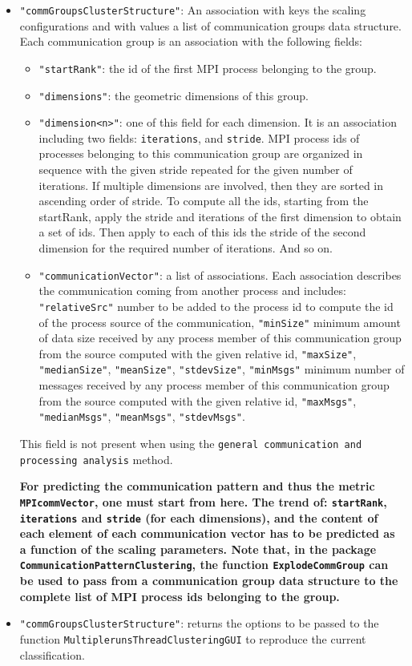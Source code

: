 \documentclass[a4paper, 10pt]{article}
\begin{document}
\begin{itemize}
 \item \verb!"commGroupsClusterStructure"!: An association with keys the scaling configurations and with values a list of communication groups \cite{wu2012}
 data structure.
 Each communication group is an association with the following fields:
 \begin{itemize}
 \item \verb!"startRank"!: the id of the first MPI process belonging to the group.
 \item \verb!"dimensions"!: the geometric dimensions of this group.
 \item \verb!"dimension<n>"!: one of this field for each dimension. It is an association including two fields: \verb!iterations!, and \verb!stride!.
 MPI process ids of processes belonging to this communication group are organized in sequence with the given stride repeated for the given
 number of iterations. If multiple dimensions are involved, then they are sorted in ascending order of stride. To compute all the ids, starting from
 the startRank, apply the stride and iterations of the first dimension to obtain a set of ids. Then apply to each of this ids the stride of the second dimension
 for the required number of iterations. And so on.
 \item \verb!"communicationVector"!: a list of associations. Each association describes the communication coming from another process and includes: 
 \verb!"relativeSrc"! number to be added to the process id to compute the id of the process source of the communication,
 \verb!"minSize"! minimum amount of data size received by any process member of this communication group from the source computed with the given relative id,
 \verb!"maxSize"!, \verb!"medianSize"!, \verb!"meanSize"!, \verb!"stdevSize"!,
 \verb!"minMsgs"! minimum number of messages received by any process member of this communication
 group from the source computed with the given relative id, \verb!"maxMsgs"!, \verb!"medianMsgs"!,
 \verb!"meanMsgs"!, \verb!"stdevMsgs"!.
 \end{itemize}
 
 
 This field is not present when using the \texttt{general communication and processing analysis} method.
 
 \textbf{For predicting the communication pattern and thus the metric \texttt{MPIcommVector}, one must start from here.
The trend of: \texttt{startRank}, \texttt{iterations} and \texttt{stride} (for each dimensions), and the content of each element of
each communication vector has to be predicted as a function of the scaling parameters.
Note that, in the package \texttt{CommunicationPatternClustering}, the function \texttt{ExplodeCommGroup} can be used to pass from a communication group
data structure to the complete list of MPI process ids belonging to the group.
 }
 \item \verb!"commGroupsClusterStructure"!: returns the options to be passed to the function \texttt{MultiplerunsThreadClusteringGUI}
 to reproduce the current classification.
\end{itemize}
\end{document}
